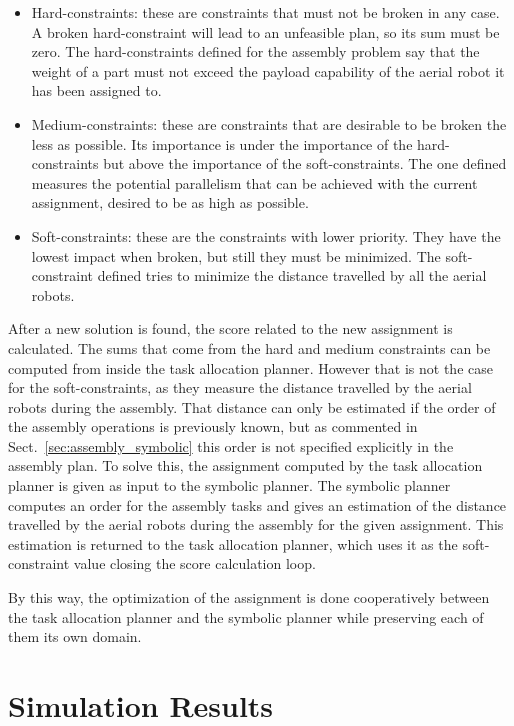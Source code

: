 \documentclass[runningheads,a4paper]{llncs}
\begin{document}
    \begin{itemize}
    	\item Hard-constraints: these are constraints that must not be broken in any case. A broken hard-constraint will lead to an unfeasible plan, so its sum must be zero. The hard-constraints defined for the assembly problem say that the weight of a part must not exceed the payload capability of the aerial robot it has been assigned to.
    	\item Medium-constraints: these are constraints that are desirable to be broken the less as possible. Its importance is under the importance of the hard-constraints but above the importance of the soft-constraints. The one defined measures the potential parallelism that can be achieved with the current assignment, desired to be as high as possible.
    	\item Soft-constraints: these are the constraints with lower priority. They have the lowest impact when broken, but still they must be minimized. The soft-constraint defined tries to minimize the distance travelled by all the aerial robots.
	\end{itemize}
	
After a new solution is found, the score related to the new assignment is calculated. The sums that come from the hard and medium constraints can be computed from inside the task allocation planner. However that is not the case for the soft-constraints, as they measure the distance travelled by the aerial robots during the assembly. That distance can only be estimated if the order of the assembly operations is previously known, but as commented in Sect.~\ref{sec:assembly_symbolic} this order is not specified explicitly in the assembly plan. To solve this, the assignment computed by the task allocation planner is given as input to the symbolic planner. The symbolic planner computes an order for the assembly tasks and gives an estimation of the distance travelled by the aerial robots during the assembly for the given assignment. This estimation is returned to the task allocation planner, which uses it as the soft-constraint value closing the score calculation loop. 

By this way, the optimization of the assignment is done cooperatively between the task allocation planner and the symbolic planner while preserving each of them its own domain.

\section{Simulation Results}
\label{sec:results}
\end{document}
